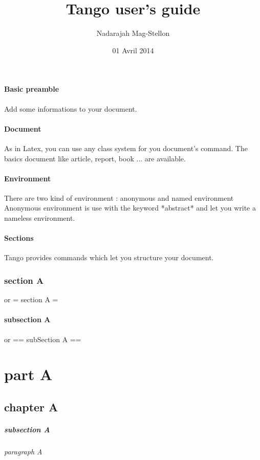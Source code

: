 \subsection{Basic preamble}
Add some informations to your document.
\begin{code}[langague=tango]
  \title{Tango user's guide}
  \author{Nadarajah Mag-Stellon}
  \date{01 Avril 2014}
\end{code}

\subsection{Document}
As in Latex, you can use any class system for you document's command.
The basics document like article, report, book ... are available.
\begin{code}[langague=tango]
\end{code}

\subsection{Environment}
There are two kind of environment : anonymous and named environment
Anonymous environment is use with the keyword *abstract* and let you write a nameless environment.
\begin{code}[langague=tango]
  \begin{EnvironementA}
  \end{EnvironmentA}

  \begin{abstract}
  \end{abstract}
\end{code}

\subsection{Sections}
Tango provides commands which let you structure your document.
\begin{code}[langague=tango]
  \section{section A} or = section A =
  \subsection{subsection A} or == subSection A ==
  \part{part A}
  \chapter{chapter A}
  \subsubsection{subsection A}
  \paragraph{paragraph A}
\end{code}

